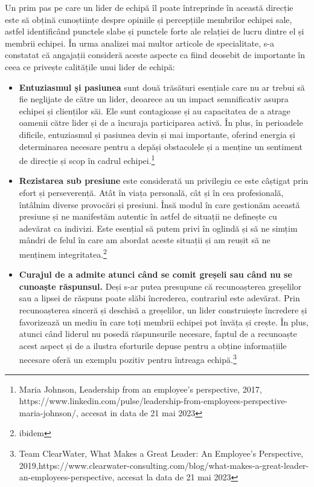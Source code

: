 \documentclass[a4paper, 12pt]{article}
\begin{document}
	\quad\quad Un prim pas pe care un lider de echipă îl poate întreprinde în această direcție este să obțină cunoștiințe despre opiniile și percepțiile membrilor echipei sale, astfel identificând punctele slabe și punctele forte ale relației de lucru dintre el și membrii echipei. În urma analizei mai multor articole de specialitate, s-a constatat că angajații consideră aceste aspecte ca fiind deosebit de importante în ceea ce privește calitățile unui lider de echipă:
	\begin{itemize}

	\item \textbf {Entuziasmul și pasiunea}  sunt două trăsături esențiale care nu ar trebui să fie neglijate de către un lider, deoarece au un impact semnificativ asupra echipei și clienților săi. Ele sunt contagioase și au capacitatea de a atrage oamenii către lider și de a încuraja participarea activă. În plus, în perioadele dificile, entuziasmul și pasiunea devin și mai importante, oferind energia și determinarea necesare pentru a depăși obstacolele și a menține un sentiment de direcție și scop în cadrul echipei.\footnote{Maria Johnson, Leadership from an employee's perspective, 2017,  https://www.linkedin.com/pulse/leadership-from-employees-perspective-maria-johnson/, accesat in data de 21 mai 2023}
	\item\textbf{Rezistarea sub presiune} este considerată un privilegiu ce este câștigat prin efort și perseverență. Atât în viața personală, cât și în cea profesională, întâlnim diverse provocări și presiuni. Însă modul în care gestionăm această presiune și ne manifestăm autentic în astfel de situații ne definește cu adevărat ca indivizi. Este esențial să putem privi în oglindă și să ne simțim mândri de felul în care am abordat aceste situații și am reușit să ne menținem integritatea.\footnote{ibidem}

	\item \textbf{Curajul de a admite atunci când se comit greșeli sau când nu se cunoaște răspunsul.} Deși s-ar putea presupune că recunoașterea greșelilor sau a lipsei de răspuns poate slăbi încrederea, contrariul este adevărat. Prin recunoașterea sinceră și deschisă a greșelilor, un lider construiește încredere și favorizează un mediu în care toți membrii echipei pot învăța și crește. În plus, atunci când liderul nu posedă răspunsurile necesare, faptul de a recunoaște acest aspect și de a ilustra eforturile depuse pentru a obține informațiile necesare oferă un exemplu pozitiv pentru întreaga echipă.\footnote{Team ClearWater, What Makes a Great Leader: An Employee's Perspective, 2019,https://www.clearwater-consulting.com/blog/what-makes-a-great-leader-an-employees-perspective, accesat la data de 21 mai 2023}


\end{itemize}
\end{document}
